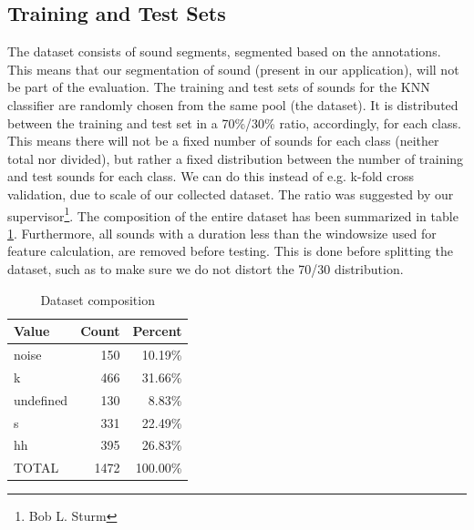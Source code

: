 	\subsection{Training and Test Sets}
		The dataset consists of sound segments, segmented based on the annotations. This means that our segmentation of sound (present in our application), will not be part of the evaluation.
		The training and test sets of sounds for the KNN classifier are randomly chosen from the same pool (the dataset). It is distributed between the training and test set in a 70\%/30\% ratio, accordingly, for each class. This means there will not be a fixed number of sounds for each class (neither total nor divided), but rather a fixed distribution between the number of training and test sounds for each class. We can do this instead of e.g. k-fold cross validation, due to scale of our collected dataset. The ratio was suggested by our supervisor\footnote{Bob L. Sturm}. The composition of the entire dataset has been summarized in table \ref{table:eval:datasetComposition}. 
		Furthermore, all sounds with a duration less than the windowsize used for feature calculation, are removed before testing. This is done before splitting the dataset, such as to make sure we do not distort the 70/30 distribution.

		\begin{table}
			\centering
			\begin{tabular}{|l|r|r|}
					\hline
					Value  &  Count  & Percent \\ \hline
			      noise    &  150    & 10.19\% \\ \hline
			          k    &  466    & 31.66\% \\ \hline
			  undefined    &  130    &  8.83\% \\ \hline
			          s    &  331    & 22.49\% \\ \hline
			         hh    &  395    & 26.83\% \\ \hline
			      TOTAL    &  1472	 & 100.00\% \\ \hline

			\end{tabular}
			\caption{Dataset composition}
			\label{table:eval:datasetComposition}
		\end{table}
		
		

